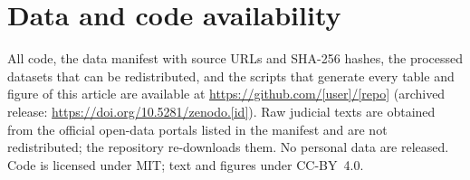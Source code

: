 
\section*{Data and code availability}
All code, the data manifest with source URLs and SHA-256 hashes, the processed datasets
that can be redistributed, and the scripts that generate every table and figure of this
article are available at \url{https://github.com/[user]/[repo]} (archived release:
\url{https://doi.org/10.5281/zenodo.[id]}). Raw judicial texts are obtained from the
official open-data portals listed in the manifest and are not redistributed; the
repository re-downloads them. No personal data are released. Code is licensed under MIT;
text and figures under CC-BY~4.0.

